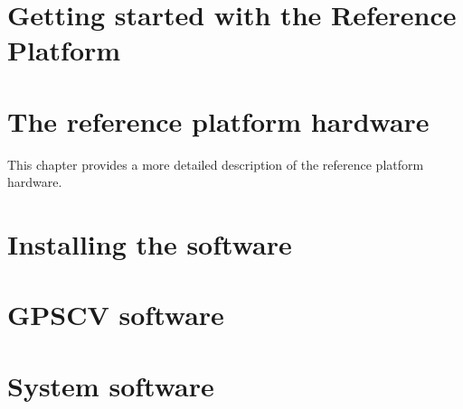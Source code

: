 \documentclass[11pt,a4paper,openany,oneside]{book}
\begin{document}


\chapter{Getting started with the Reference Platform}



\chapter{The reference platform hardware}

This chapter provides a more detailed description of the reference platform hardware.





\chapter{Installing the software}


\chapter{GPSCV software}



\chapter{System software}
\end{document}
